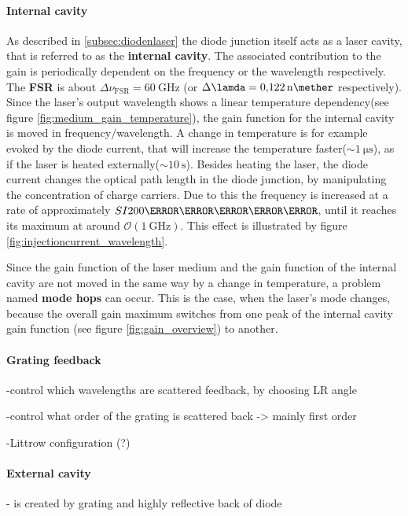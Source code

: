 \paragraph{Internal cavity}
As described in \ref{subsec:diodenlaser} the diode junction itself
acts as a laser cavity, that is referred to as the \textbf{internal cavity}.
The associated contribution to the gain is periodically dependent on
the frequency or the wavelength respectively. The \textbf{FSR} is about
$\Delta\nu_{\text{FSR}} = \SI{60}{\giga\hertz}$ (or
$\Delta\lamda = \SI{0.122}{\nano\mether}$ respectively).
Since the laser's output wavelength shows a linear
temperature dependency(see figure \ref{fig:medium_gain_temperature}),
the gain function for the internal cavity is moved in frequency$/$wavelength.
A change in temperature is for example evoked by the diode current,
that will increase the temperature faster($\sim \SI{1}{\micro\second}$),
as if the laser is heated externally($\sim \SI{10}{\second}$).
Besides heating the laser, the diode current changes the optical
path length in the diode junction, by manipulating the concentration
of charge carriers. Due to this the frequency is increased at a rate of
approximately $SI{200}{\mega\hertz\per\milli\ampere}$, until it reaches
its maximum at around $\mathcal{O}(\SI{1}{\giga\hertz})$.
This effect is illustrated by figure \ref{fig:injectioncurrent_wavelength}.


Since the gain function of the laser medium and the gain function of
the internal cavity are not moved in the same way by a change in temperature,
a problem named \textbf{mode hops} can occur. This is the case,
when the laser's mode changes, because the overall gain maximum
switches from one peak of the internal cavity
gain function (see figure \ref{fig:gain_overview}) to another.



\paragraph{Grating feedback}
-control which wavelengths are scattered feedback,
  by choosing LR angle

-control what order of the grating is scattered back
  -> mainly first order

-Littrow configuration (?)


\paragraph{External cavity}
- is created by grating and highly reflective back of diode

